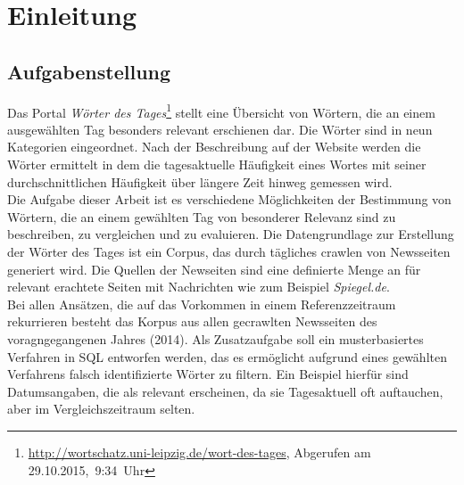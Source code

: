


\ourtitlepage 
\tableofcontents
{} %
\clearpage
{} %



\chapter{Einleitung}

\section{Aufgabenstellung}
Das Portal  \emph{Wörter des Tages}\footnote{\url{http://wortschatz.uni-leipzig.de/wort-des-tages}, Abgerufen am 29.10.2015,~9:34~Uhr} stellt eine Übersicht von Wörtern, die an einem ausgewählten Tag besonders relevant erschienen dar. Die Wörter sind in neun Kategorien eingeordnet. Nach der Beschreibung auf der Website werden die Wörter ermittelt in dem die tagesaktuelle Häufigkeit eines Wortes mit seiner durchschnittlichen Häufigkeit über längere Zeit hinweg gemessen wird.\\
Die Aufgabe dieser Arbeit ist es verschiedene Möglichkeiten der Bestimmung von Wörtern, die an einem gewählten Tag von besonderer Relevanz sind zu beschreiben, zu vergleichen und zu evaluieren. 
Die Datengrundlage zur Erstellung der Wörter des Tages ist ein Corpus, das durch tägliches crawlen von Newsseiten generiert wird. Die Quellen der Newseiten sind eine definierte Menge an für relevant erachtete Seiten mit Nachrichten wie zum Beispiel \emph{Spiegel.de}.\\
Bei allen Ansätzen, die auf das Vorkommen in einem Referenzzeitraum rekurrieren besteht das Korpus aus allen gecrawlten Newsseiten des voragngegangenen Jahres (2014).
Als Zusatzaufgabe soll ein musterbasiertes Verfahren in SQL entworfen werden, das es ermöglicht aufgrund eines gewählten Verfahrens falsch identifizierte Wörter zu filtern. Ein Beispiel hierfür sind Datumsangaben, die als relevant erscheinen, da sie Tagesaktuell oft auftauchen, aber im Vergleichszeitraum selten.

